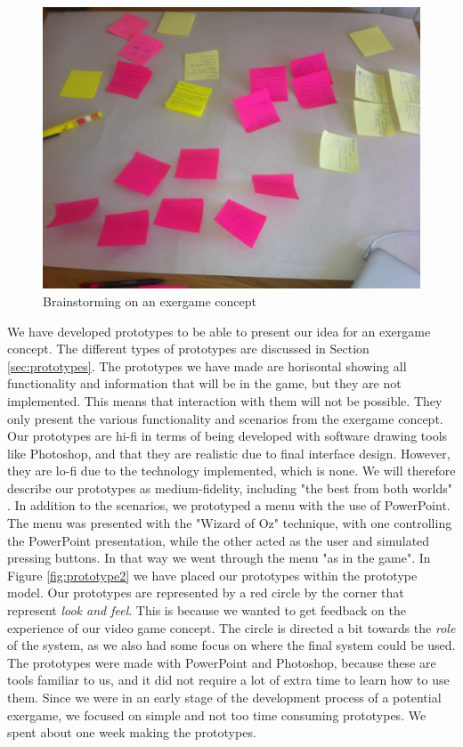 \begin{figure} [H]
\centering
\includegraphics[scale=0.07]{brainstorming}
\caption[Brainstorming on an exergame concept]{Brainstorming on an exergame concept}
\label{fig:brainstorming}
\end{figure} 

We have developed prototypes to be able to present our idea for an exergame concept. The different types of prototypes are discussed in Section \ref{sec:prototypes}. The prototypes we have made are horisontal showing all functionality and information that will be in the game, but they are not implemented. This means that interaction with them will not be possible. They only present the various functionality and scenarios from the exergame concept. Our prototypes are hi-fi in terms of being developed with software drawing tools like Photoshop, and that they are realistic due to final interface design. However, they are lo-fi due to the technology implemented, which is none. We will therefore describe our prototypes as medium-fidelity, including "the best from both worlds" \cite{mediumfidelity}. In addition to the scenarios, we prototyped a menu with the use of PowerPoint. The menu was presented with the "Wizard of Oz" technique, with one controlling the PowerPoint presentation, while the other acted as the user and simulated pressing buttons. In that way we went through the menu "as in the game". In Figure \ref{fig:prototype2} we have placed our prototypes within the prototype model. Our prototypes are represented by a red circle by the corner that represent \emph{look and feel}. This is because we wanted to get feedback on the experience of our video game concept. The circle is directed a bit towards the \emph{role} of the system, as we also had some focus on where the final system could be used. The prototypes were made with PowerPoint and Photoshop, because these are tools familiar to us, and it did not require a lot of extra time to learn how to use them. Since we were in an early stage of the development process of a potential exergame, we focused on simple and not too time consuming prototypes. We spent about one week making the prototypes.

